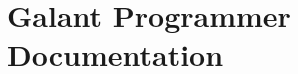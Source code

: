 \documentclass{article}
\begin{document}
\section{Galant Programmer Documentation}


\end{document}
